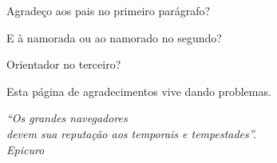 \documentclass[
	11pt,				%
	openright,			%
	oneside,			%
	a4paper,			%
	english,			%
	french,				%
	spanish,			%
	brazil,				%
	]{abntex2}
\begin{document}
\begin{agradecimentos}

Agradeço aos pais no primeiro parágrafo?

E à namorada ou ao namorado no segundo?

Orientador no terceiro?

Esta página de agradecimentos vive dando problemas.

\end{agradecimentos}

\begin{epigrafe}
    \vspace*{\fill}
	\begin{flushright}
		\textit{``Os grandes navegadores \\devem sua reputação aos temporais e tempestades''.\\
		Epicuro}
	\end{flushright}
\end{epigrafe}




\end{document}
